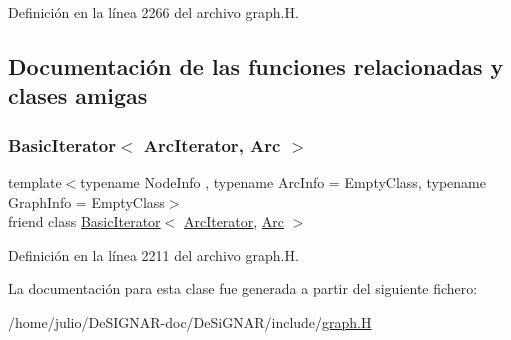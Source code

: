 Definición en la línea 2266 del archivo graph.\+H.



\subsection{Documentación de las funciones relacionadas y clases amigas}
\mbox{\label{class_designar_1_1_digraph_1_1_arc_iterator_a530ad7c7218fa9b74a5cce004d0e3a1c}} 
\subsubsection{\texorpdfstring{Basic\+Iterator$<$ Arc\+Iterator, Arc $>$}{BasicIterator< ArcIterator, Arc >}}
{\footnotesize\ttfamily template$<$typename Node\+Info , typename Arc\+Info  = Empty\+Class, typename Graph\+Info  = Empty\+Class$>$ \\
friend class \hyperlink{class_designar_1_1_basic_iterator}{Basic\+Iterator}$<$ \hyperlink{class_designar_1_1_digraph_1_1_arc_iterator}{Arc\+Iterator}, \hyperlink{class_designar_1_1_digraph_a0ceb278671f2a535c00fddccdeafd69f}{Arc} $>$\hspace{0.3cm}{\ttfamily [friend]}}



Definición en la línea 2211 del archivo graph.\+H.



La documentación para esta clase fue generada a partir del siguiente fichero\+:\begin{DoxyCompactItemize}
\item 
/home/julio/\+De\+S\+I\+G\+N\+A\+R-\/doc/\+De\+Si\+G\+N\+A\+R/include/\hyperlink{graph_8_h}{graph.\+H}\end{DoxyCompactItemize}
